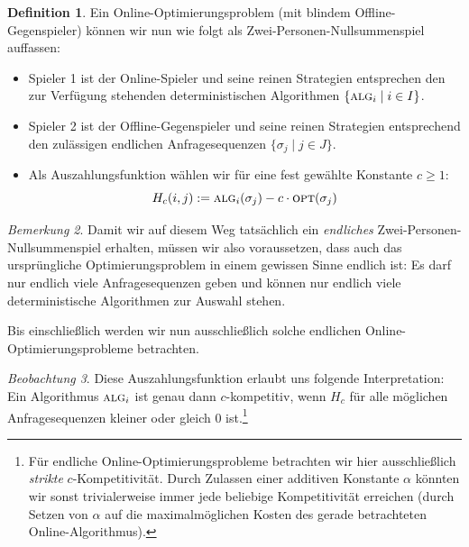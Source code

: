 \documentclass[a4paper,ngerman,12pt,bibtotoc]{scrartcl}
\theoremstyle{definition}
\newtheorem{defn}{Definition}[section]
\theoremstyle{plain}
\theoremstyle{remark}
\newtheorem{bem}[defn]{Bemerkung}
\newtheorem{beob}[defn]{Beobachtung}
\renewcommand{\_}{\mathpunct{.}\,}
\newcommand{\?}{\,{:}\,}
\newcommand{\Alg}{\ensuremath{\textsc{alg}}}
\newcommand{\Opt}{\ensuremath{\textsc{opt}}}
\newcommand{\Hf}{H}
\newcommand{\ZPNS}{Zwei-Personen-Nullsummenspiel }
\begin{document}
	\begin{defn}
		Ein Online-Optimierungsproblem (mit blindem Offline-Gegenspieler) können wir nun wie folgt als \ZPNS auffassen:
		\begin{itemize}
			\item Spieler 1 ist der Online-Spieler und seine reinen Strategien entsprechen den zur Verfügung stehenden deterministischen Algorithmen $\{\Alg_i \mid i \in I\}$.
			\item Spieler 2 ist der Offline-Gegenspieler und seine reinen Strategien entsprechend den zulässigen endlichen Anfragesequenzen $\{\sigma_j \mid j \in J\}$.
			\item Als Auszahlungsfunktion wählen wir für eine fest gewählte Konstante $c \geq 1$:
			\[\Hf_c(i,j) := \Alg_i(\sigma_j) - c\cdot\Opt(\sigma_j)\]
		\end{itemize}
	\end{defn}
	
	\begin{bem}
		Damit wir auf diesem Weg tatsächlich ein \emph{endliches} \ZPNS erhalten, müssen wir also voraussetzen, dass auch das ursprüngliche Optimierungsproblem in einem gewissen Sinne endlich ist: Es darf nur endlich viele Anfragesequenzen geben und können nur endlich viele deterministische Algorithmen zur Auswahl stehen.
		
		Bis einschließlich  werden wir nun ausschließlich solche endlichen Online-Optimierungsprobleme betrachten.
	\end{bem}
	
	\begin{beob}
		Diese Auszahlungsfunktion erlaubt uns folgende Interpretation: Ein Algorithmus $\Alg_i$ ist genau dann $c$-kompetitiv, wenn $\Hf_c$ für alle möglichen Anfragesequenzen kleiner oder gleich 0 ist.\footnote{Für endliche Online-Optimierungsprobleme betrachten wir hier ausschließlich \emph{strikte} $c$-Kompetitivität. Durch Zulassen einer additiven Konstante $\alpha$ könnten wir sonst trivialerweise immer jede beliebige Kompetitivität erreichen (durch Setzen von $\alpha$ auf die maximalmöglichen Kosten des gerade betrachteten Online-Algorithmus). }
	\end{beob}
	
\end{document}

